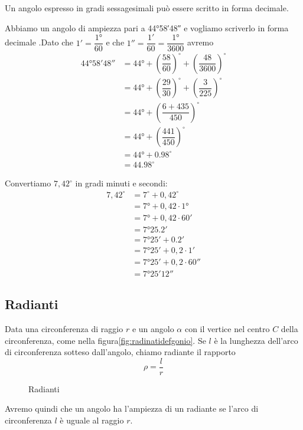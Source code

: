 Un angolo espresso in gradi sessagesimali può essere scritto in forma decimale. 
\begin{esempio}
 Abbiamo un angolo di ampiezza pari a \ang{44;58;48} e vogliamo scriverlo in forma decimale .Dato che $\ang{;1;}=\dfrac{\ang{1}}{60}$ e che $\ang{;;1}=\dfrac{\ang{;1;}}{60}=\dfrac{\ang{1}}{3600}$  avremo
\begin{align*}
	\ang{44;58;48}&=\ang{44}+\left(\dfrac{58}{60}\right)^{\circ}+\left(\dfrac{48}{3600} \right)^{\circ}\\
	&=\ang{44}+\left(\dfrac{29}{30}\right)^{\circ}+\left(\dfrac{3}{225} \right)^{\circ}\\
	&=\ang{44}+\left(\dfrac{6+435}{450} \right)^{\circ}\\
	&=\ang{44}+\left(\dfrac{441}{450} \right)^{\circ}\\
	&=\ang{44}+\num{0,98}^{\circ}\\
	&=\num{44,98}^{\circ}
\end{align*}
\end{esempio}
\begin{esempio}
Convertiamo $7,42^{\circ}$ in gradi minuti e secondi:
\begin{align*}
	7,42^{\circ}&=7^{\circ}+0,42^{\circ}\\
	&=\ang{7}+0,42\cdot \ang{1}\\
	&=\ang{7}+0,42\cdot \ang{;60;}\\
	&=\ang{7;25,2;}\\
	&=\ang{7;25;}+\ang{;0,2;}\\
	&=\ang{7;25;}+0,2\cdot\ang{;1;}\\
	&=\ang{7;25;}+0,2\cdot\ang{;;60}\\
	&=\ang{7;25;12}
\end{align*} 
\end{esempio}
\subsection{Radianti}
\begin{definizione}[Radiante]
Data una circonferenza di raggio $r$ e  un angolo $\alpha$ con il vertice nel centro $C$ della circonferenza, come nella figura\nobs\vref{fig:radinatidefgonio}. Se $l$ è la lunghezza dell'arco di circonferenza sotteso dall'angolo, chiamo radiante il rapporto \[\rho=\dfrac{l}{r} \]
\end{definizione}
\begin{figure}
	\centering
	
	\caption{Radianti}
	\label{fig:radinatidefgonio}
\end{figure}
Avremo quindi che un angolo ha l'ampiezza di un radiante se l'arco di circonferenza $l$ è uguale al raggio $r$.

